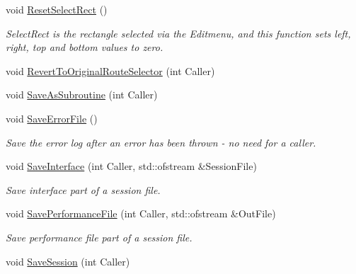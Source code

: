 \begin{DoxyCompactItemize}
void \mbox{\hyperlink{class_t_interface_a970fd0fd4d725c80c6e2c4cd0c27cf0c}{Reset\+Select\+Rect}} ()
\begin{DoxyCompactList}\small\item\em Select\+Rect is the rectangle selected via the \textquotesingle{}Edit\textquotesingle{}menu, and this function sets left, right, top and bottom values to zero. \end{DoxyCompactList}\item 
void \mbox{\hyperlink{class_t_interface_a0f47d9e893d3558de2e6d9082b3fadd0}{Revert\+To\+Original\+Route\+Selector}} (int Caller)
\item 
void \mbox{\hyperlink{class_t_interface_a1b3189e6a50555f5952652d12b978e57}{Save\+As\+Subroutine}} (int Caller)
\item 
\mbox{\label{class_t_interface_a0109f801142d4fa3becae22e23b84163}} 
void \mbox{\hyperlink{class_t_interface_a0109f801142d4fa3becae22e23b84163}{Save\+Error\+File}} ()
\begin{DoxyCompactList}\small\item\em Save the error log after an error has been thrown -\/ no need for a caller. \end{DoxyCompactList}\item 
\mbox{\label{class_t_interface_aee36e0cef9c182125b1095ceaf37a568}} 
void \mbox{\hyperlink{class_t_interface_aee36e0cef9c182125b1095ceaf37a568}{Save\+Interface}} (int Caller, std\+::ofstream \&Session\+File)
\begin{DoxyCompactList}\small\item\em Save interface part of a session file. \end{DoxyCompactList}\item 
\mbox{\label{class_t_interface_a33d2ed7b588fb4cf12c410312e949299}} 
void \mbox{\hyperlink{class_t_interface_a33d2ed7b588fb4cf12c410312e949299}{Save\+Performance\+File}} (int Caller, std\+::ofstream \&Out\+File)
\begin{DoxyCompactList}\small\item\em Save performance file part of a session file. \end{DoxyCompactList}\item 
\mbox{\label{class_t_interface_a3362cfff4fa746fdb4871fe9d6c5ba25}} 
void \mbox{\hyperlink{class_t_interface_a3362cfff4fa746fdb4871fe9d6c5ba25}{Save\+Session}} (int Caller)

\end{DoxyCompactItemize}
